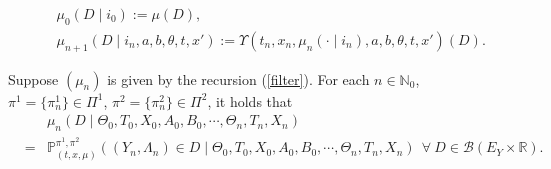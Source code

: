 \documentclass[10pt,a4paper]{amsart}
\begin{document}
\begin{eqnarray}\label{filter}
&&\mu_0(D\mid i_0):=\mu(D),\nonumber\\
&&\mu_{n+1}(D\mid i_n,a,b,\theta,t,x'):=\Upsilon(t_n,x_n,\mu_n(\cdot\mid i_n),a,b,\theta,t,x')(D).
\end{eqnarray}

 \begin{theorem}\label{thm1}
 Suppose $(\mu_n)$ is given by the recursion (\ref{filter}).
 For each $n\in\mathbb{N}_0$, $\pi^1=\{\pi_n^1\}\in\Pi^1$, $\pi^2=\{\pi_n^2\}\in\Pi^2$, it holds that
 \begin{eqnarray*}
 &&\mu_n(D\mid \Theta_0,T_0,X_0,A_0,B_0,\cdots,\Theta_n,T_n,X_n)\\
 &=&\mathbb{P}^{\pi^1,\pi^2}_{(t,x,\mu)}((Y_n,\Lambda_n)\in D\mid \Theta_0,T_0,X_0,A_0,B_0,\cdots,\Theta_n,T_n,X_n)~~\forall~D\in\mathscr{B} (E_Y\times\mathbb{R}).
 \end{eqnarray*}
 \end{theorem}
\end{document}

